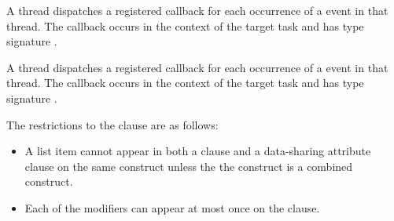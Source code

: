 \tools

A thread dispatches a registered 
callback for each occurrence of a  event in that thread.
The callback occurs in the context of the target task and has type signature 
.

A thread dispatches a registered 
callback for each occurrence of a  event in that thread.
The callback occurs in the context of the target task and has type signature 
.

\restrictions
The restrictions to the  clause are as follows:

\begin{itemize}
\item A list item cannot appear in both a  clause and a data-sharing
      attribute clause on the same construct unless the the construct is a
      combined construct.
\item Each of the  modifiers can appear at most once on the
       clause.



\end{itemize}
